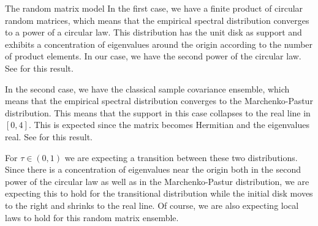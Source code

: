\documentclass[11pt, a4paper, oneside]{book}
\numberwithin{equation}{chapter}
\begin{document}
\begin{section}{The random matrix model}
In the first case, we have a finite product of circular random matrices, which means that the empirical spectral distribution converges to a power of a circular law. This distribution has the unit disk as support and exhibits a concentration of eigenvalues around the origin according to the number of product elements. In our case, we have the second power of the circular law. See \cite{o2011products} for this result.

In the second case, we have the classical sample covariance ensemble, which means that the empirical spectral distribution converges to the Marchenko-Pastur distribution. This means that the support in this case collapses to the real line in $[0,4]$. This is expected since the matrix becomes Hermitian and the eigenvalues real. See \cite{marchenko1967distribution} for this result.

For $\tau \in (0,1)$ we are expecting a transition between these two distributions. Since there is a concentration of eigenvalues near the origin both in the second power of the circular law as well as in the Marchenko-Pastur distribution, we are expecting this to hold for the transitional distribution while the initial disk moves to the right and shrinks to the real line. Of course, we are also expecting local laws to hold for this random matrix ensemble.
\end{section}
\end{document}
